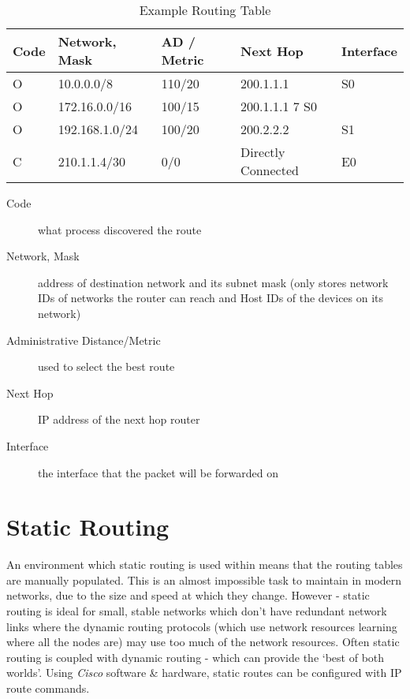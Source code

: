 \begin{table}[H]
    \centering
    {\RaggedRight
    \begin{tabular}{p{} p{} p{} p{} p{}}
    \textbf{Code} & \textbf{Network, Mask} & \textbf{AD / Metric} & \textbf{Next Hop} & \textbf{Interface}\\
    \hline
    \hline
    O & 10.0.0.0/8 & 110/20 & 200.1.1.1 & S0\\
    \hline
    O & 172.16.0.0/16 & 100/15 & 200.1.1.1 7 S0\\
    \hline
    O & 192.168.1.0/24 & 100/20 & 200.2.2.2 & S1\\
    \hline
    C & 210.1.1.4/30 & 0/0 & Directly Connected & E0\\
    \hline
    \end{tabular}
    } %
    \caption{Example Routing Table}
\end{table}
\begin{description}
    \item[Code] what process discovered the route
    \item[Network, Mask] address of destination network and its subnet mask (only stores network IDs of networks the router can reach and Host IDs of the devices on its network)
    \item[Administrative Distance/Metric] used to select the best route
    \item[Next Hop] IP address of the next hop router
    \item[Interface] the interface that the packet will be forwarded on
\end{description}

\section{Static Routing}
An environment which static routing is used within means that the routing tables are manually populated. This is an almost impossible task to maintain in modern networks, due to the size and speed at which they change. However - static routing is ideal for small, stable networks which don't have redundant network links where the dynamic routing protocols (which use network resources learning where all the nodes are) may use too much of the network resources. Often static routing is coupled with dynamic routing - which can provide the `best of both worlds'. Using \textit{Cisco} software \& hardware, static routes can be configured with IP route commands.

